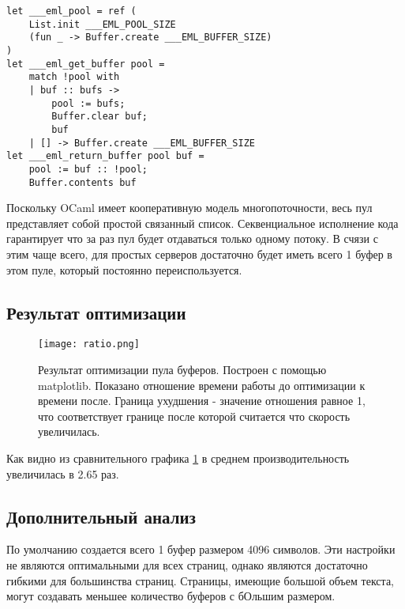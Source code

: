 \begin{lstlisting}
let ___eml_pool = ref (
    List.init ___EML_POOL_SIZE 
    (fun _ -> Buffer.create ___EML_BUFFER_SIZE)
)
let ___eml_get_buffer pool =
    match !pool with
    | buf :: bufs ->
        pool := bufs;
        Buffer.clear buf;
        buf
    | [] -> Buffer.create ___EML_BUFFER_SIZE
let ___eml_return_buffer pool buf =
    pool := buf :: !pool;
    Buffer.contents buf
\end{lstlisting}

Поскольку OCaml имеет кооперативную модель многопоточности, весь пул представляет собой простой связанный список.
Секвенциальное исполнение кода гарантирует что за раз пул будет отдаваться только одному потоку.
В счязи с этим чаще всего, для простых серверов достаточно будет иметь всего 1 буфер в этом пуле, который постоянно переиспользуется.



\subsection{Результат оптимизации}

\begin{figure}[h!]
    \texttt{[image: ratio.png]}
    \caption{Результат оптимизации пула буферов. Построен с помощью matplotlib. Показано отношение времени работы до оптимизации к времени после. Граница ухудшения - значение отношения равное 1, что соответствует границе после которой считается что скорость увеличилась.}
    \label{fig:ratio}
\end{figure}

Как видно из сравнительного графика \ref{fig:ratio} в среднем производительность увеличилась в 2.65 раз.

\subsection{Дополнительный анализ}

По умолчанию создается всего 1 буфер размером 4096 символов.
Эти настройки не являются оптимальными для всех страниц, однако являются достаточно гибкими для большинства страниц.
Страницы, имеющие большой объем текста, могут создавать меньшее количество буферов с бОльшим размером.

